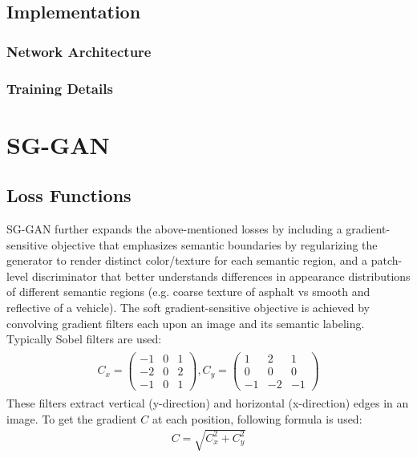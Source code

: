 \subsection{Implementation}
\subsubsection{Network Architecture}
\subsubsection{Training Details}

\section{SG-GAN}

\subsection{Loss Functions}
SG-GAN \cite{DBLP:journals/corr/abs-1801-01726} further expands the above-mentioned losses by including a gradient-sensitive objective that emphasizes semantic boundaries by regularizing the generator to render distinct color/texture for each semantic region, and a patch-level discriminator that better understands differences in appearance distributions of different semantic regions (e.g. coarse texture of asphalt vs smooth and reflective of a vehicle). The soft gradient-sensitive objective is achieved by convolving gradient filters each upon an image and its semantic labeling. Typically Sobel filters are used:
\begin{align}
	\begin{array}{cc}
		C_x = 
		\begin{pmatrix}
			-1 & 0 & 1\\
			-2 & 0 & 2\\
			-1 & 0 & 1
		\end{pmatrix},
		C_y = 
		\begin{pmatrix}
			1 & 2 & 1\\
			0 & 0 & 0\\
			-1 & -2 & -1
		\end{pmatrix}
	\end{array}
\end{align}
These filters extract vertical (y-direction) and horizontal (x-direction) edges in an image. To get the gradient $C$ at each position, following formula is used:
\begin{align}
	C = \sqrt{C_x^2 + C_y^2}
\end{align}
